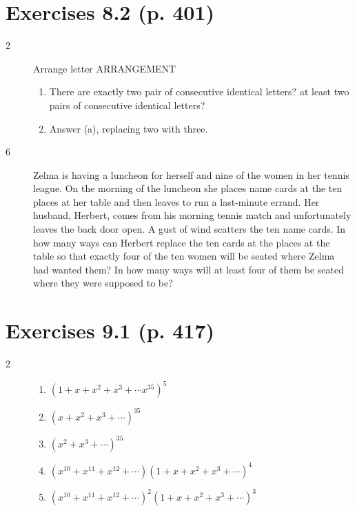 \documentclass[a4paper]{article}
\begin{document}
\section*{Exercises 8.2 (p. 401)}
\begin{description}
\item[2] Arrange letter ARRANGEMENT
\begin{enumerate}[label=\alph*)]
    \item There are exactly two pair of consecutive identical letters? at least two pairs of consecutive identical letters?
    \item Answer (a), replacing two with three.
\end{enumerate}
\item[6] Zelma is having a luncheon for herself and nine of the women in her tennis league. On the morning of the luncheon she places name cards at the ten places at her table and then leaves to run a last-minute errand. Her husband, Herbert, comes from his morning tennis match and unfortunately leaves the back door open. A gust of wind scatters the ten name cards. In how many ways can Herbert replace the ten cards at the places at the table so that exactly four of the ten women will be seated where Zelma had wanted them? In how many ways will at least four of them be seated where they were supposed to be?
\end{description}

\section*{Exercises 9.1 (p. 417) }
\begin{description}
\item [2]
\begin{enumerate}[label=(\alph*)]
    \item $(1+x+x^2+x^3+\cdots x^{35})^5$
    \item $(x+x^2+x^3+\cdots)^35$
    \item $(x^2+x^3+\cdots)^35$
    \item $(x^{10}+x^{11}+x^{12}+\cdots)(1+x+x^2+x^3+\cdots)^4$
    \item $(x^{10}+x^{11}+x^{12}+\cdots)^2(1+x+x^2+x^3+\cdots)^3$
\end{enumerate}
\end{description}
    
\end{document}
